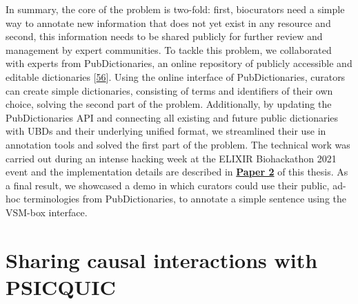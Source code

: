 \documentclass[
  12pt,
]{book}
\begin{document}
In summary, the core of the problem is two-fold: first, biocurators need a simple way to annotate new information that does not yet exist in any resource and second, this information needs to be shared publicly for further review and management by expert communities.
To tackle this problem, we collaborated with experts from PubDictionaries, an online repository of publicly accessible and editable dictionaries {[}\protect\hyperlink{ref-Kim2019}{56}{]}.
Using the online interface of PubDictionaries, curators can create simple dictionaries, consisting of terms and identifiers of their own choice, solving the second part of the problem.
Additionally, by updating the PubDictionaries API and connecting all existing and future public dictionaries with UBDs and their underlying unified format, we streamlined their use in annotation tools and solved the first part of the problem.
The technical work was carried out during an intense hacking week at the ELIXIR Biohackathon 2021 event and the implementation details are described in \textbf{\protect\hyperlink{Paper2}{Paper 2}} of this thesis.
As a final result, we showcased a demo in which curators could use their public, ad-hoc terminologies from PubDictionaries, to annotate a simple sentence using the VSM-box interface.

\newpage

\hypertarget{psicquic-chapter}{%
\section*{Sharing causal interactions with PSICQUIC}\label{psicquic-chapter}}

\indent
\end{document}
